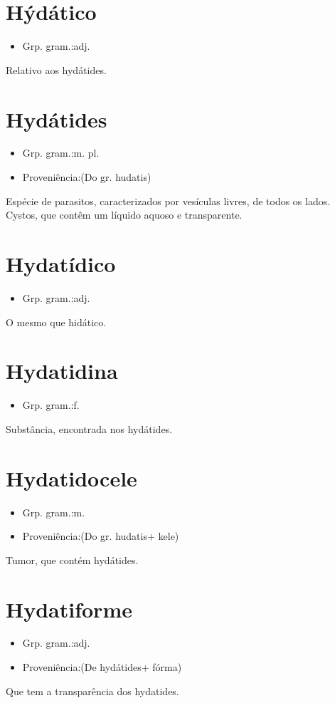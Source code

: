\documentclass{article}
\begin{document}
\section{Hýdático}
\begin{itemize}
\item {Grp. gram.:adj.}
\end{itemize}
Relativo aos hydátides.
\section{Hydátides}
\begin{itemize}
\item {Grp. gram.:m. pl.}
\end{itemize}
\begin{itemize}
\item {Proveniência:(Do gr. \textunderscore hudatis\textunderscore )}
\end{itemize}
Espécie de parasitos, caracterizados por vesículas livres, de todos os lados.
Cystos, que contêm um líquido aquoso e transparente.
\section{Hydatídico}
\begin{itemize}
\item {Grp. gram.:adj.}
\end{itemize}
O mesmo que \textunderscore hidático\textunderscore .
\section{Hydatidina}
\begin{itemize}
\item {Grp. gram.:f.}
\end{itemize}
Substância, encontrada nos hydátides.
\section{Hydatidocele}
\begin{itemize}
\item {Grp. gram.:m.}
\end{itemize}
\begin{itemize}
\item {Proveniência:(Do gr. \textunderscore hudatis\textunderscore  + \textunderscore kele\textunderscore )}
\end{itemize}
Tumor, que contém hydátides.
\section{Hydatiforme}
\begin{itemize}
\item {Grp. gram.:adj.}
\end{itemize}
\begin{itemize}
\item {Proveniência:(De \textunderscore hydátides\textunderscore  + \textunderscore fórma\textunderscore )}
\end{itemize}
Que tem a transparência dos hydatides.
\end{document}
